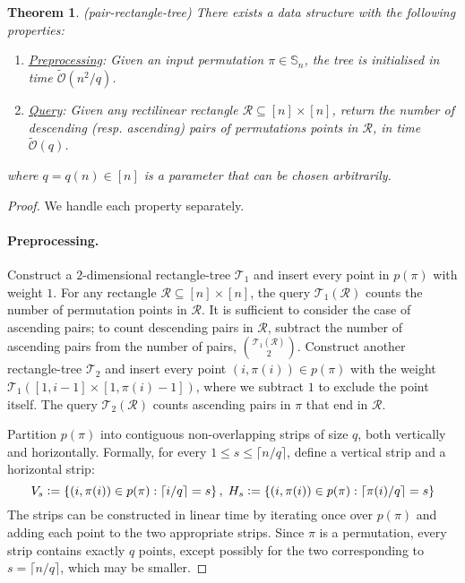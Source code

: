 \documentclass{article}
\newtheorem{theorem}{Theorem}[section]
\newcommand{\Sn}{\mathbb{S}_n}
\newcommand{\eqdef}{\vcentcolon=}
\theoremstyle{remark}
\newcommand{\Otilde}[1]{\widetilde{\mathcal{O}}\left( #1 \right)}
\theoremstyle{plain}
\begin{document}
\begin{theorem}(pair-rectangle-tree)
    \label{thm:pair_rect_tree}
    There exists a data structure with the following properties:
    \begin{enumerate}
        \item \underline{Preprocessing}: Given an input permutation $\pi \in \Sn$, the tree is initialised in time $\Otilde{n^2 / q}$.
        \item \underline{Query}: Given any rectilinear rectangle $\mathcal{R} \subseteq [n] \times [n]$, return the number of descending (resp. ascending) pairs of permutations points in $\mathcal{R}$, in time $\Otilde{q}$.
    \end{enumerate}
    where $q=q(n) \in [n]$ is a parameter that can be chosen arbitrarily. 
\end{theorem}
\begin{proof} We handle each property separately.

    \paragraph{Preprocessing.}
    Construct a $2$-dimensional rectangle-tree $\mathcal{T}_1$ and insert every point in $p(\pi)$ with weight $1$.
    For any rectangle $\mathcal{R}\subseteq [n] \times [n]$,
    the query $\mathcal{T}_1(\mathcal{R})$ counts the number of permutation points in $\mathcal{R}$.
    It is sufficient to consider the case of ascending pairs;
    to count descending pairs in $\mathcal{R}$, subtract the number of ascending pairs from the number of pairs, $\binom{\mathcal{T}_1(\mathcal{R})}{2}$.
    Construct another rectangle-tree $\mathcal{T}_2$ and insert every point $(i,\pi(i))\in p(\pi)$ with the weight $\mathcal{T}_1([1,i-1]\times [1,\pi(i)-1])$,
    where we subtract $1$ to exclude the point itself.
    The query $\mathcal{T}_2(\mathcal{R})$ counts ascending pairs in $\pi$ that end in $\mathcal{R}$.

    Partition $p(\pi)$ into contiguous non-overlapping strips of size $q$, both vertically and horizontally.
    Formally, for every $1\le s\le\lceil n/q \rceil$, define a vertical strip and a horizontal strip:
    \[
    V_{s}\eqdef\left\{ (i,\pi(i)) \in p(\pi) : \left\lceil i/q \right\rceil = s\right\},\;H_{s}\eqdef\left\{ (i,\pi(i))\in p(\pi)  : \left\lceil \pi(i)/q \right\rceil = s\right\}
    \]
    The strips can be constructed in linear time by iterating once over $p(\pi)$ and adding each point to the two appropriate strips.
    Since $\pi$ is a permutation, every strip contains exactly $q$ points,
    except possibly for the two corresponding to $s=\lceil n / q \rceil$, which may be smaller.
    

\end{proof}
\end{document}
